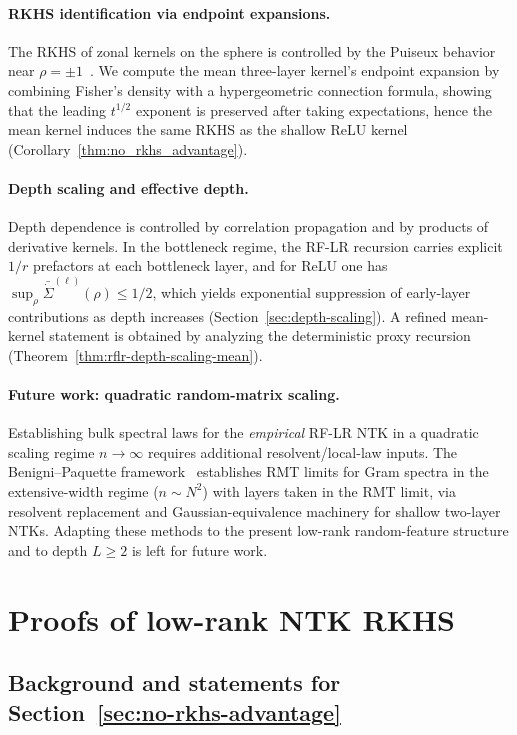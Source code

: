 \paragraph{RKHS identification via endpoint expansions.}
The RKHS of zonal kernels on the sphere is controlled by the Puiseux behavior near \(\rho=\pm 1\)~\cite{bietti2021deepequalsshallowrelu}. We compute the mean three-layer kernel's endpoint expansion by combining Fisher's density with a hypergeometric connection formula, showing that the leading \(t^{1/2}\) exponent is preserved after taking expectations, hence the mean kernel induces the same RKHS as the shallow ReLU kernel (Corollary~\ref{thm:no_rkhs_advantage}).

\paragraph{Depth scaling and effective depth.}
Depth dependence is controlled by correlation propagation and by products of derivative kernels. In the bottleneck regime, the RF-LR recursion carries explicit \(1/r\) prefactors at each bottleneck layer, and for ReLU one has \(\sup_{\rho}\bar{\dot{\Sigma}}^{(\ell)}(\rho)\le 1/2\), which yields exponential suppression of early-layer contributions as depth increases (Section~\ref{sec:depth-scaling}). A refined mean-kernel statement is obtained by analyzing the deterministic proxy recursion (Theorem~\ref{thm:rflr-depth-scaling-mean}).

\paragraph{Future work: quadratic random-matrix scaling.}
Establishing bulk spectral laws for the \emph{empirical} RF-LR NTK in a quadratic scaling regime \(n\to\infty\) requires additional resolvent/local-law inputs. The Benigni--Paquette framework~\cite{benigni2025eigenvaluedistributionneuraltangent} establishes RMT limits for Gram spectra in the extensive-width regime (\(n\sim N^2\)) with layers taken in the RMT limit, via resolvent replacement and Gaussian-equivalence machinery for shallow two-layer NTKs. Adapting these methods to the present low-rank random-feature structure and to depth \(L\ge 2\) is left for future work.

\section{Proofs of low-rank NTK RKHS}

\subsection{Background and statements for Section~\ref{sec:no-rkhs-advantage}}\label{appendix:rkhs-statements}
